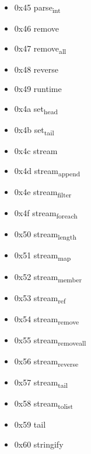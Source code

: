 \documentclass[11pt]{article}
\begin{document}
\begin{itemize}
\item 0x45 parse\textsubscript{int}

\item 0x46 remove

\item 0x47 remove\textsubscript{all}

\item 0x48 reverse

\item 0x49 runtime

\item 0x4a set\textsubscript{head}

\item 0x4b set\textsubscript{tail}

\item 0x4c stream

\item 0x4d stream\textsubscript{append}

\item 0x4e stream\textsubscript{filter}

\item 0x4f stream\textsubscript{for}\textsubscript{each}

\item 0x50 stream\textsubscript{length}

\item 0x51 stream\textsubscript{map}

\item 0x52 stream\textsubscript{member}

\item 0x53 stream\textsubscript{ref}

\item 0x54 stream\textsubscript{remove}

\item 0x55 stream\textsubscript{remove}\textsubscript{all}

\item 0x56 stream\textsubscript{reverse}

\item 0x57 stream\textsubscript{tail}

\item 0x58 stream\textsubscript{to}\textsubscript{list}

\item 0x59 tail

\item 0x60 stringify
\end{itemize}
\end{document}
